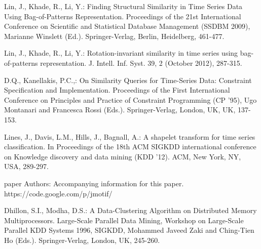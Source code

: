 \documentclass{llncs}
\begin{document}
\begin{thebibliography}{5}
Lin, J., Khade, R., Li, Y.:
Finding Structural Similarity in Time Series Data Using Bag-of-Patterns Representation. 
Proceedings of the 21st International Conference on Scientific and Statistical Database Management (SSDBM 2009),
Marianne Winslett (Ed.). Springer-Verlag, Berlin, Heidelberg, 461-477.

Lin, J., Khade, R., Li, Y.:
Rotation-invariant similarity in time series using bag-of-patterns representation. 
J. Intell. Inf. Syst. 39, 2 (October 2012), 287-315.

D.Q., Kanellakis, P.C.,:
On Similarity Queries for Time-Series Data: Constraint Specification and Implementation. 
Proceedings of the First International Conference on Principles and Practice of Constraint Programming (CP '95), 
Ugo Montanari and Francesca Rossi (Eds.). Springer-Verlag, London, UK, UK, 137-153.

Lines, J., Davis, L.M., Hills, J., Bagnall, A.:
A shapelet transform for time series classification. 
In Proceedings of the 18th ACM SIGKDD international conference on Knowledge discovery and data mining (KDD '12). 
ACM, New York, NY, USA, 289-297.

paper Authors: 
Accompanying information for this paper. 
https://code.google.com/p/jmotif/

Dhillon, S.I., Modha, D.S.: 
A Data-Clustering Algorithm on Distributed Memory Multiprocessors. 
Large-Scale Parallel Data Mining, Workshop on Large-Scale Parallel KDD Systems 1996, SIGKDD,
Mohammed Javeed Zaki and Ching-Tien Ho (Eds.). Springer-Verlag, London, UK, 245-260.

\end{thebibliography}

%
\end{document}
